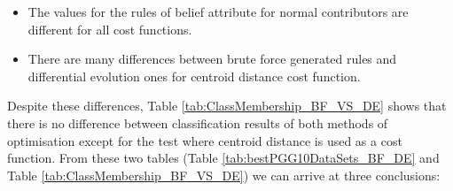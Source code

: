 \begin{itemize}
    \item The values for the rules of belief attribute for normal contributors are different for all cost functions.
    
    \item There are many differences between brute force generated rules and differential evolution ones for centroid distance cost function.
    
\end{itemize}

Despite these differences, Table \ref{tab:ClassMembership_BF_VS_DE} shows that there is no difference between classification results of both methods of optimisation except for the test where centroid distance is used as a cost function. From these two tables (Table \ref{tab:bestPGG10DataSets_BF_DE} and Table \ref{tab:ClassMembership_BF_VS_DE}) we can arrive at three conclusions:

